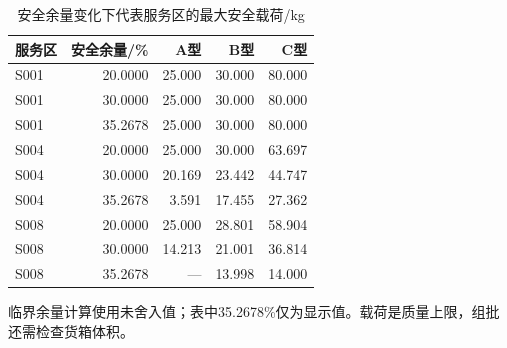 \begin{table}[htbp]\centering\small
\caption{安全余量变化下代表服务区的最大安全载荷/kg}\label{tab:q1_payload_response}
\begin{tabular}{lrrrr}\toprule 服务区 & 安全余量/\% & A型 & B型 & C型\\\midrule
S001 & 20.0000 & 25.000 & 30.000 & 80.000\\
S001 & 30.0000 & 25.000 & 30.000 & 80.000\\
S001 & 35.2678 & 25.000 & 30.000 & 80.000\\
S004 & 20.0000 & 25.000 & 30.000 & 63.697\\
S004 & 30.0000 & 20.169 & 23.442 & 44.747\\
S004 & 35.2678 & 3.591 & 17.455 & 27.362\\
S008 & 20.0000 & 25.000 & 28.801 & 58.904\\
S008 & 30.0000 & 14.213 & 21.001 & 36.814\\
S008 & 35.2678 & --- & 13.998 & 14.000\\
\bottomrule\end{tabular}
\par\smallskip\footnotesize 临界余量计算使用未舍入值；表中35.2678\%仅为显示值。载荷是质量上限，组批还需检查货箱体积。
\end{table}
